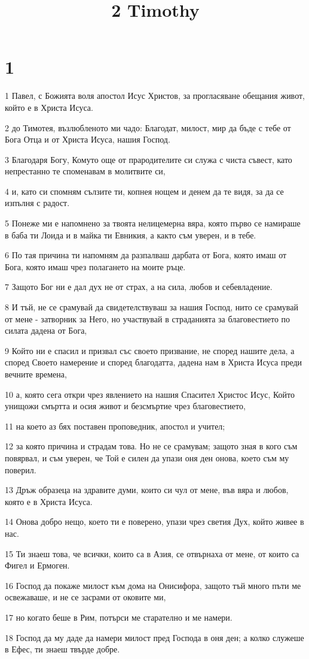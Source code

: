 

\title{2 Timothy}


\chapter{1}

\par 1 Павел, с Божията воля апостол Исус Христов, за прогласяване обещания живот, който е в Христа Исуса.
\par 2 до Тимотея, възлюбленото ми чадо: Благодат, милост, мир да бъде с тебе от Бога Отца и от Христа Исуса, нашия Господ.
\par 3 Благодаря Богу, Комуто още от прародителите си служа с чиста съвест, като непрестанно те споменавам в молитвите си,
\par 4 и, като си спомням сълзите ти, копнея нощем и денем да те видя, за да се изпълня с радост.
\par 5 Понеже ми е напомнено за твоята нелицемерна вяра, която първо се намираше в баба ти Лоида и в майка ти Евникия, а както съм уверен, и в тебе.
\par 6 По тая причина ти напомням да разпалваш дарбата от Бога, която имаш от Бога, която имаш чрез полагането на моите ръце.
\par 7 Защото Бог ни е дал дух не от страх, а на сила, любов и себевладение.
\par 8 И тъй, не се срамувай да свидетелствуваш за нашия Господ, нито се срамувай от мене - затворник за Него, но участвувай в страданията за благовестието по силата дадена от Бога,
\par 9 Който ни е спасил и призвал със своето призвание, не според нашите дела, а според Своето намерение и според благодатта, дадена нам в Христа Исуса преди вечните времена,
\par 10 а, която сега откри чрез явлението на нашия Спасител Христос Исус, Който унищожи смъртта и осия живот и безсмъртие чрез благовестието,
\par 11 на което аз бях поставен проповедник, апостол и учител;
\par 12 за която причина и страдам това. Но не се срамувам; защото зная в кого съм повярвал, и съм уверен, че Той е силен да упази оня ден онова, което съм му поверил.
\par 13 Дръж образеца на здравите думи, които си чул от мене, във вяра и любов, която е в Христа Исуса.
\par 14 Онова добро нещо, което ти е поверено, упази чрез светия Дух, който живее в нас.
\par 15 Ти знаеш това, че всички, които са в Азия, се отвърнаха от мене, от които са Фигел и Ермоген.
\par 16 Господ да покаже милост към дома на Онисифора, защото тъй много пъти ме освежаваше, и не се засрами от оковите ми,
\par 17 но когато беше в Рим, потърси ме старателно и ме намери.
\par 18 Господ да му даде да намери милост пред Господа в оня ден; а колко служеше в Ефес, ти знаеш твърде добре.

